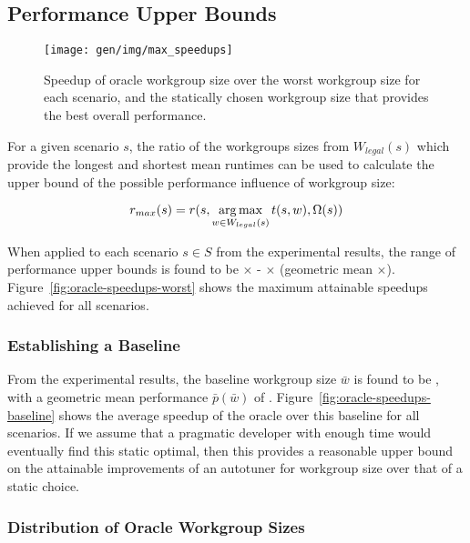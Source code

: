 

\subsection{Performance Upper Bounds}


\begin{figure}
\texttt{[image: gen/img/max\_speedups]}
\caption{%
  Speedup of oracle workgroup size over the worst workgroup size for
  each scenario, and the statically chosen workgroup size that
  provides the best overall performance.%
}
\label{fig:speedups}
\end{figure}

For a given scenario $s$, the ratio of the workgroups sizes from
$W_{legal}(s)$ which provide the longest and shortest mean runtimes
can be used to calculate the upper bound of the possible performance
influence of workgroup size:

\begin{equation}
r_{max}(s) = r(s, \operatorname*{arg\,max}_{w \in W_{legal}(s)} t(s,w), \Omega(s))
\end{equation}

When applied to each scenario $s \in S$ from the experimental results,
the range of performance upper bounds is found to be
$\times$ -
$\times$ (geometric mean
$\times$). Figure~\ref{fig:oracle-speedups-worst}
shows the maximum attainable speedups achieved for all scenarios.

\subsubsection{Establishing a Baseline}


From the experimental results, the baseline workgroup size $\bar{w}$
is found to be , with a geometric mean performance
$\bar{p}(\bar{w})$ of
. Figure~\ref{fig:oracle-speedups-baseline}
shows the average speedup of the oracle over this baseline for all
scenarios. If we assume that a pragmatic developer with enough time
would eventually find this static optimal, then this provides a
reasonable upper bound on the attainable improvements of an autotuner
for workgroup size over that of a static choice.


\subsubsection{Distribution of Oracle Workgroup Sizes}


